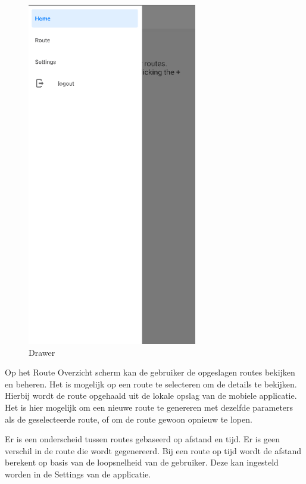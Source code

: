     \begin{figure}[H]
        \includegraphics[width=20em]{./graphics/drawer.png}
        \centering
        \caption{Drawer}
        \label{fig:drawer}
    \end{figure}

    Op het Route Overzicht scherm kan de gebruiker de opgeslagen routes bekijken en beheren. Het is mogelijk op een route te selecteren om de details te bekijken. Hierbij wordt de route opgehaald uit de lokale opslag van de mobiele applicatie. Het is hier mogelijk om een nieuwe route te genereren met dezelfde parameters als de geselecteerde route, of om de route gewoon opnieuw te lopen.

    \vspace{1cm}


    Er is een onderscheid tussen routes gebaseerd op afstand en tijd. Er is geen verschil in de route die wordt gegenereerd. Bij een route op tijd wordt de afstand berekent op basis van de loopsnelheid van de gebruiker. Deze kan ingesteld worden in de Settings van de applicatie.

